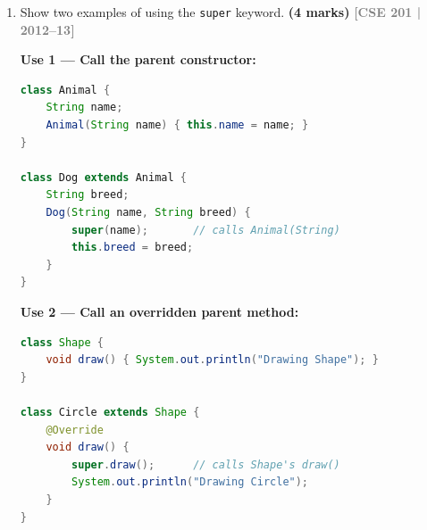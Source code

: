 \documentclass[12pt,a3paper]{article}
\newcommand{\yr}[1]{\hfill\textcolor{gray}{\small\textbf{[#1]}}}
\newcommand{\mk}[1]{\textcolor{orange!70!black}{\small\textbf{(#1 marks)}}}
\begin{document}
\begin{enumerate}
\begin{tcolorbox}[enhanced,breakable,ansbox,
  colback=cC!4,colframe=cC,boxrule=0.8pt,arc=5pt,
  title={\textbf{Answer --- Student Class with inc() Method}},
  fonttitle=\bfseries\color{white},colbacktitle=cC]
\begin{lstlisting}[language=Java]
    int getUnits() { return unitsCompleted; }
    void inc()     { unitsCompleted++; }

    @Override
    public String toString() {
        return "Student{id=" + id + ", name=" + name
               + ", course=" + course
               + ", units=" + unitsCompleted + "}";
    }
}

class StudentDemo {
    public static void main(String[] args) {
        Student s = new Student(1, "Alice", "CSE", 30);

        System.out.println("Units before inc(): " + s.getUnits());
        s.inc();
        System.out.println("Units after  inc(): " + s.getUnits());
        System.out.println("State: " + s);
    }
}
\end{lstlisting}
\textbf{Output:}
\begin{verbatim}
Units before inc(): 30
Units after  inc(): 31
State: Student{id=1, name=Alice, course=CSE, units=31}
\end{verbatim}
\end{tcolorbox}

\item Show two examples of using the \texttt{super} keyword. \mk{4}
\yr{CSE 201 | 2012--13}

\begin{tcolorbox}[enhanced,breakable,ansbox,
  colback=cC!4,colframe=cC,boxrule=0.8pt,arc=5pt,
  title={\textbf{Answer --- Two Uses of the \texttt{super} Keyword}},
  fonttitle=\bfseries\color{white},colbacktitle=cC]

\textbf{Use 1 --- Call the parent constructor:}
\begin{lstlisting}[language=Java]
class Animal {
    String name;
    Animal(String name) { this.name = name; }
}

class Dog extends Animal {
    String breed;
    Dog(String name, String breed) {
        super(name);       // calls Animal(String)
        this.breed = breed;
    }
}
\end{lstlisting}

\textbf{Use 2 --- Call an overridden parent method:}
\begin{lstlisting}[language=Java]
class Shape {
    void draw() { System.out.println("Drawing Shape"); }
}

class Circle extends Shape {
    @Override
    void draw() {
        super.draw();      // calls Shape's draw()
        System.out.println("Drawing Circle");
    }
}
\end{lstlisting}
\end{tcolorbox}


\end{enumerate}
\end{document}

